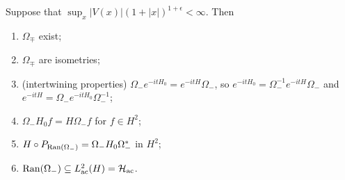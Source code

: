 \begin{theorem}
  Suppose that $\sup_x |V(x)| (1 + |x|)^{1 + \epsilon} < \infty$. Then
  \begin{enumerate}
    \item $\Omega_{\mp}$ exist;
    \item $\Omega_{\mp}$ are isometries;
    \item (intertwining properties)
      $\Omega_- e^{-itH_0} = e^{-itH} \Omega_-$, so
      $e^{-itH_0} = \Omega_-^{-1} e^{-itH} \Omega_-$
      and $e^{-itH} = \Omega_- e^{-itH_0} \Omega_-^{-1}$;
    \item $\Omega_- H_0 f = H \Omega_- f$
      for $f \in H^2$;
    \item $H \circ P_{\operatorname{Ran}(\Omega_-)} = \Omega_- H_0 \Omega_-^*$
      in $H^2$;
    \item $\operatorname{Ran}(\Omega_-) \subseteq L^2_{\mathrm{ac}}(H) = \mathcal{H}_{\mathrm{ac}}$.
  \end{enumerate}
\end{theorem}

